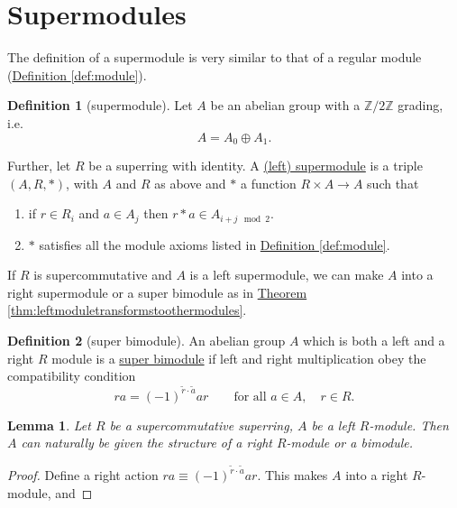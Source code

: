 \documentclass[a4paper,10pt]{scrreprt}
\newcommand{\Z}{\mathbb{Z}}
\newcommand{\defn}[1]{\ul{#1}}
\theoremstyle{definition}
\newtheorem{definition}{Definition}[section]
\theoremstyle{plain}
\newtheorem{lemma}{Lemma}[section]
\theoremstyle{remark}
\begin{document}
\section{Supermodules}
The definition of a supermodule is very similar to that of a regular module (\hyperref[def:module]{Definition \ref*{def:module}}).
\begin{definition}[supermodule]
  \label{def:supermodule}
  Let $A$ be an abelian group with a $\Z/2\Z$ grading, i.e.
  \begin{equation*}
    A = A_{0}\oplus A_{1}.
  \end{equation*}

  Further, let $R$ be a superring with identity. A \defn{(left) supermodule} is a triple $(A,R,* )$, with $A$ and $R$ as above and $*$ a function $R \times A \to A$ such that
  \begin{enumerate}
    \item if $r \in R_{i}$ and $a \in A_{j}$ then $r*a \in A_{i+j \mod{2}}$.
    \item $*$ satisfies all the module axioms listed in \hyperref[def:module]{Definition \ref*{def:module}}.
  \end{enumerate}
\end{definition}

If $R$ is supercommutative and $A$ is a left supermodule, we can make $A$ into a right supermodule or a super bimodule as in \hyperref[thm:leftmoduletransformstoothermodules]{Theorem \ref*{thm:leftmoduletransformstoothermodules}}.

\begin{definition}[super bimodule]
  \label{def:superbimodule}
  An abelian group $A$ which is both a left and a right $R$ module is a \defn{super bimodule} if left and right multiplication obey the compatibility condition
  \begin{equation*}
    ra = (-1)^{\tilde{r}\cdot \tilde{a}} ar\qquad \text{for all }a\in A,\quad r \in R.
  \end{equation*}
\end{definition}

\begin{lemma}
  Let $R$ be a supercommutative superring, $A$ be a left $R$-module. Then $A$ can naturally be given the structure of a right $R$-module or a bimodule.
\end{lemma}
\begin{proof}
  Define a right action $ra \equiv (-1)^{\tilde{r}\cdot \tilde{a}} ar$. This makes $A$ into a right $R$-module, and 
\end{proof}
\end{document}
